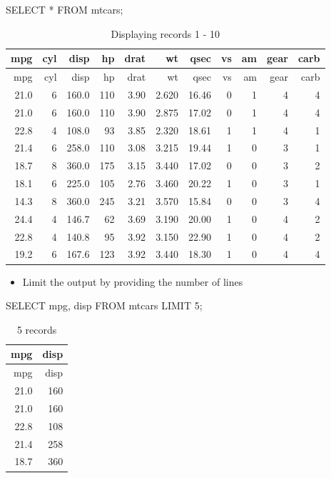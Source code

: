 \documentclass[
  letterpaper,
  DIV=11,
  numbers=noendperiod]{scrreprt}
\newenvironment{Shaded}{\begin{snugshade}}{\end{snugshade}}
\newcommand{\DecValTok}[1]{\textcolor[rgb]{0.68,0.00,0.00}{#1}}
\newcommand{\KeywordTok}[1]{\textcolor[rgb]{0.00,0.23,0.31}{#1}}
\newcommand{\NormalTok}[1]{\textcolor[rgb]{0.00,0.23,0.31}{#1}}
\newcommand{\OperatorTok}[1]{\textcolor[rgb]{0.37,0.37,0.37}{#1}}
\providecommand{\tightlist}{%
  \setlength{\itemsep}{0pt}\setlength{\parskip}{0pt}}\usepackage{longtable,booktabs,array}
\begin{document}
\begin{Shaded}
\begin{Highlighting}[]
\KeywordTok{SELECT} \OperatorTok{*} \KeywordTok{FROM}\NormalTok{ mtcars;}
\end{Highlighting}
\end{Shaded}

\begin{longtable}[]{@{}rrrrrrrrrrr@{}}
\caption{Displaying records 1 - 10}\tabularnewline
\toprule()
mpg & cyl & disp & hp & drat & wt & qsec & vs & am & gear & carb \\
\midrule()
\endfirsthead
\toprule()
mpg & cyl & disp & hp & drat & wt & qsec & vs & am & gear & carb \\
\midrule()
\endhead
21.0 & 6 & 160.0 & 110 & 3.90 & 2.620 & 16.46 & 0 & 1 & 4 & 4 \\
21.0 & 6 & 160.0 & 110 & 3.90 & 2.875 & 17.02 & 0 & 1 & 4 & 4 \\
22.8 & 4 & 108.0 & 93 & 3.85 & 2.320 & 18.61 & 1 & 1 & 4 & 1 \\
21.4 & 6 & 258.0 & 110 & 3.08 & 3.215 & 19.44 & 1 & 0 & 3 & 1 \\
18.7 & 8 & 360.0 & 175 & 3.15 & 3.440 & 17.02 & 0 & 0 & 3 & 2 \\
18.1 & 6 & 225.0 & 105 & 2.76 & 3.460 & 20.22 & 1 & 0 & 3 & 1 \\
14.3 & 8 & 360.0 & 245 & 3.21 & 3.570 & 15.84 & 0 & 0 & 3 & 4 \\
24.4 & 4 & 146.7 & 62 & 3.69 & 3.190 & 20.00 & 1 & 0 & 4 & 2 \\
22.8 & 4 & 140.8 & 95 & 3.92 & 3.150 & 22.90 & 1 & 0 & 4 & 2 \\
19.2 & 6 & 167.6 & 123 & 3.92 & 3.440 & 18.30 & 1 & 0 & 4 & 4 \\
\bottomrule()
\end{longtable}

\begin{itemize}
\tightlist
\item
  Limit the output by providing the number of lines
\end{itemize}

\begin{Shaded}
\begin{Highlighting}[]
\KeywordTok{SELECT}\NormalTok{ mpg, disp }\KeywordTok{FROM}\NormalTok{ mtcars }\KeywordTok{LIMIT} \DecValTok{5}\NormalTok{;}
\end{Highlighting}
\end{Shaded}

\begin{longtable}[]{@{}rr@{}}
\caption{5 records}\tabularnewline
\toprule()
mpg & disp \\
\midrule()
\endfirsthead
\toprule()
mpg & disp \\
\midrule()
\endhead
21.0 & 160 \\
21.0 & 160 \\
22.8 & 108 \\
21.4 & 258 \\
18.7 & 360 \\
\bottomrule()
\end{longtable}
\end{document}
